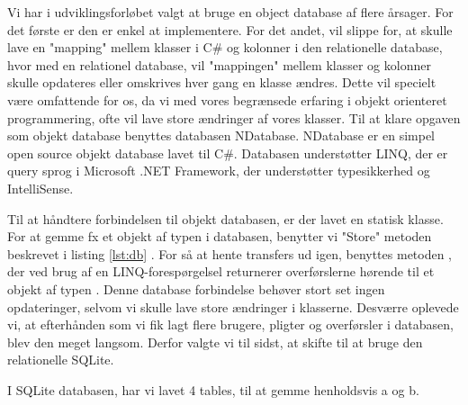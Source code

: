 Vi har i udviklingsforløbet valgt at bruge en object database af flere årsager. For det første er den er enkel at implementere. For det andet, vil slippe for, at skulle lave en "mapping" mellem klasser i C\# og kolonner i den relationelle database, hvor med en relationel database, vil "mappingen" mellem klasser og kolonner skulle opdateres eller omskrives hver gang en klasse ændres. Dette vil specielt være omfattende for os, da vi med vores begrænsede erfaring i objekt orienteret programmering, ofte vil lave store ændringer af vores klasser.
Til at klare opgaven som objekt database benyttes databasen NDatabase. NDatabase er en simpel open source objekt database lavet til C\#. Databasen understøtter LINQ, der er query sprog i Microsoft .NET Framework, der understøtter typesikkerhed og IntelliSense\cite{linqdok}.

Til at håndtere forbindelsen til objekt databasen, er der lavet en statisk klasse. For at gemme fx et objekt af typen  i databasen, benytter vi "Store" metoden beskrevet i listing \ref{lst:db} . For så at hente transfers ud igen, benyttes metoden , der ved brug af en LINQ-forespørgelsel returnerer overførslerne hørende til et objekt af typen . Denne database forbindelse behøver stort set ingen opdateringer, selvom vi skulle lave store ændringer i klasserne.
Desværre oplevede vi, at efterhånden som vi fik lagt flere brugere, pligter og overførsler i databasen, blev den meget langsom. Derfor valgte vi til sidst, at skifte til at bruge den relationelle SQLite.

I SQLite databasen, har vi lavet 4 tables, til at gemme henholdsvis a og b.

\newenvironment{nscenter}
 {\parskip=0pt\par\nopagebreak\centering}
 {\par\noindent\ignorespacesafterend}
 
\newcommand{\cent}[1]{\hspace*{\fill}#1\hspace*{\fill}}
 
